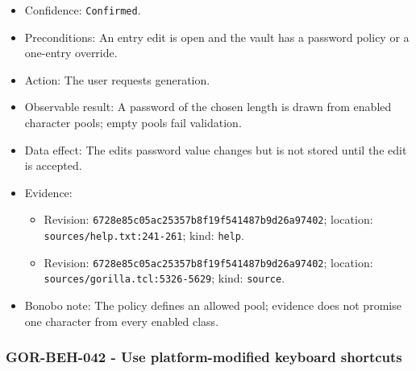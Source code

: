 \documentclass[
  letterpaper,
]{article}
\newcommand{\passthrough}[1]{#1}
\providecommand{\tightlist}{%
  \setlength{\itemsep}{0pt}\setlength{\parskip}{0pt}}
\begin{document}
\begin{itemize}
\tightlist
\item
  Confidence: \passthrough{\lstinline!Confirmed!}.
\item
  Preconditions: An entry edit is open and the vault has a password policy or a one-entry override.
\item
  Action: The user requests generation.
\item
  Observable result: A password of the chosen length is drawn from enabled character pools; empty pools fail validation.
\item
  Data effect: The edit\textquotesingle s password value changes but is not stored until the edit is accepted.
\item
  Evidence:

  \begin{itemize}
  \tightlist
  \item
    Revision: \nolinkurl{6728e85c05ac25357b8f19f541487b9d26a97402}; location: \nolinkurl{sources/help.txt:241-261};
    kind: \passthrough{\lstinline!help!}.
  \item
    Revision: \nolinkurl{6728e85c05ac25357b8f19f541487b9d26a97402}; location: \nolinkurl{sources/gorilla.tcl:5326-5629};
    kind: \passthrough{\lstinline!source!}.
  \end{itemize}
\item
  Bonobo note: The policy defines an allowed pool; evidence does not promise one character from every enabled class.
\end{itemize}

\subsubsection{GOR-BEH-042 - Use platform-modified keyboard
shortcuts}\label{gor-beh-042---use-platform-modified-keyboard-shortcuts}
\end{document}
